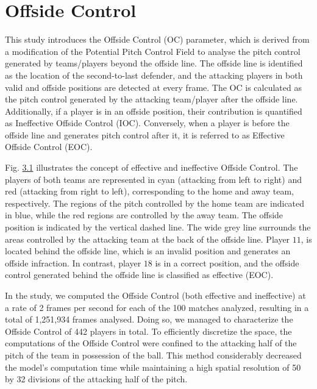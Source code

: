 \documentclass[twoside,nohyper]{tufte-book}
\begin{document}
\hypertarget{offside-control-1}{%
\chapter{Offside Control}\label{offside-control-1}}

This study introduces the Offside Control (OC) parameter, which is
derived from a modification of the Potential Pitch Control Field to
analyse the pitch control generated by teams/players beyond the offside
line. The offside line is identified as the location of the
second-to-last defender, and the attacking players in both valid and
offside positions are detected at every frame. The OC is calculated as
the pitch control generated by the attacking team/player after the
offside line. Additionally, if a player is in an offside position, their
contribution is quantified as Ineffective Offside Control (IOC).
Conversely, when a player is before the offside line and generates pitch
control after it, it is referred to as Effective Offside Control (EOC).

Fig. \protect\hyperlink{f3.1}{3.1} illustrates the
concept of effective and ineffective Offside Control. The players of
both teams are represented in cyan (attacking from left to right) and
red (attacking from right to left), corresponding to the home and away
team, respectively. The regions of the pitch controlled by the home team
are indicated in blue, while the red regions are controlled by the away
team. The offside position is indicated by the vertical dashed line. The
wide grey line surrounds the areas controlled by the attacking team at
the back of the offside line. Player \(11\), is located behind the offside
line, which is an invalid position and generates an offside infraction.
In contrast, player \(18\) is in a correct position, and the offside
control generated behind the offside line is classified as effective
(EOC).

In the study, we computed the Offside Control (both effective and
ineffective) at a rate of 2 frames per second for each of the 100
matches analyzed, resulting in a total of 1,251,934 frames analysed.
Doing so, we managed to characterize the Offside Control of 442 players
in total. To efficiently discretize the space, the computations of the
Offside Control were confined to the attacking half of the pitch of the
team in possession of the ball. This method considerably decreased the
model's computation time while maintaining a high spatial resolution of
50 by 32 divisions of the attacking half of the pitch.
\end{document}
